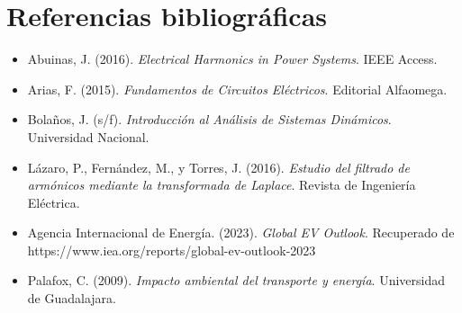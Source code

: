 \section{Referencias bibliogr\'aficas}
\label{sec:referencias}

\begin{itemize}
  \item Abuinas, J. (2016). \textit{Electrical Harmonics in Power Systems}. IEEE Access.
  \item Arias, F. (2015). \textit{Fundamentos de Circuitos El\'ectricos}. Editorial Alfaomega.
  \item Bola\~nos, J. (s/f). \textit{Introducci\'on al An\'alisis de Sistemas Din\'amicos}. Universidad Nacional.
  \item L\'azaro, P., Fern\'andez, M., y Torres, J. (2016). \textit{Estudio del filtrado de arm\'onicos mediante la transformada de Laplace}. Revista de Ingenier\'ia El\'ectrica.
  \item Agencia Internacional de Energ\'ia. (2023). \textit{Global EV Outlook}. Recuperado de https://www.iea.org/reports/global-ev-outlook-2023
  \item Palafox, C. (2009). \textit{Impacto ambiental del transporte y energ\'ia}. Universidad de Guadalajara.
\end{itemize}
